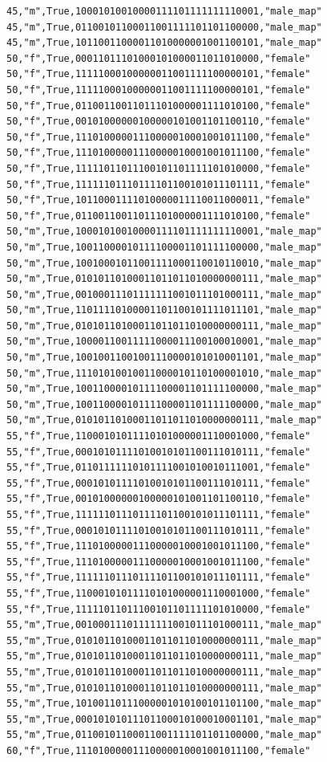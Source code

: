 \documentclass[authoryearcitations]{UoYCSproject}
\begin{document}
\begin{framed}
\begin{verbatim}
45,"m",True,10001010010000111101111111110001,"male_map"
45,"m",True,01100101100011001111101101100000,"male_map"
45,"m",True,10110011000011010000001001100101,"male_map"
50,"f",True,00011011101000101000011011010000,"female"
50,"f",True,11111000100000011001111100000101,"female"
50,"f",True,11111000100000011001111100000101,"female"
50,"f",True,01100110011011101000001111010100,"female"
50,"f",True,00101000000100000101001101100110,"female"
50,"f",True,11101000001110000010001001011100,"female"
50,"f",True,11101000001110000010001001011100,"female"
50,"f",True,11111011011100101101111101010000,"female"
50,"f",True,11111101110111101100101011101111,"female"
50,"f",True,10110001111010000011110011000011,"female"
50,"f",True,01100110011011101000001111010100,"female"
50,"m",True,10001010010000111101111111110001,"male_map"
50,"m",True,10011000010111100001101111100000,"male_map"
50,"m",True,10010001011001111000110010110010,"male_map"
50,"m",True,01010110100011011011010000000111,"male_map"
50,"m",True,00100011101111111001011101000111,"male_map"
50,"m",True,11011110100001101100101111011101,"male_map"
50,"m",True,01010110100011011011010000000111,"male_map"
50,"m",True,10000110011111000011100100010001,"male_map"
50,"m",True,10010011001001110000101010001101,"male_map"
50,"m",True,11101010010011000010110100001010,"male_map"
50,"m",True,10011000010111100001101111100000,"male_map"
50,"m",True,10011000010111100001101111100000,"male_map"
50,"m",True,01010110100011011011010000000111,"male_map"
55,"f",True,11000101011110101000001110001000,"female"
55,"f",True,00010101111010010101100111010111,"female"
55,"f",True,01101111110101111001010010111001,"female"
55,"f",True,00010101111010010101100111010111,"female"
55,"f",True,00101000000100000101001101100110,"female"
55,"f",True,11111101110111101100101011101111,"female"
55,"f",True,00010101111010010101100111010111,"female"
55,"f",True,11101000001110000010001001011100,"female"
55,"f",True,11101000001110000010001001011100,"female"
55,"f",True,11111101110111101100101011101111,"female"
55,"f",True,11000101011110101000001110001000,"female"
55,"f",True,11111011011100101101111101010000,"female"
55,"m",True,00100011101111111001011101000111,"male_map"
55,"m",True,01010110100011011011010000000111,"male_map"
55,"m",True,01010110100011011011010000000111,"male_map"
55,"m",True,01010110100011011011010000000111,"male_map"
55,"m",True,01010110100011011011010000000111,"male_map"
55,"m",True,10100110111000001010100101101100,"male_map"
55,"m",True,00010101011101100010100010001101,"male_map"
55,"m",True,01100101100011001111101101100000,"male_map"
60,"f",True,11101000001110000010001001011100,"female"

\end{verbatim}
\end{framed}
\end{document}
